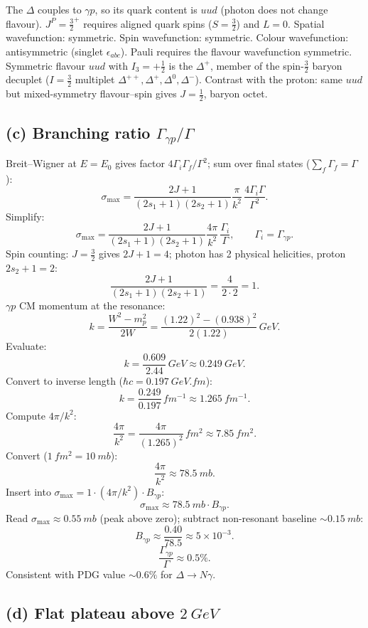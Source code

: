 \documentclass[11pt]{article}
\begin{document}
The $\Delta$ couples to $\gamma p$, so its quark content is $uud$ (photon does not change flavour). $J^{P}=\tfrac32^{+}$ requires aligned quark spins ($S=\tfrac32$) and $L=0$. Spatial wavefunction: symmetric. Spin wavefunction: symmetric. Colour wavefunction: antisymmetric (singlet $\epsilon_{abc}$). Pauli requires the flavour wavefunction symmetric. Symmetric flavour $uud$ with $I_3=+\tfrac12$ is the $\Delta^{+}$, member of the spin-$\tfrac32$ baryon decuplet ($I=\tfrac32$ multiplet $\Delta^{++},\Delta^{+},\Delta^{0},\Delta^{-}$). Contrast with the proton: same $uud$ but mixed-symmetry flavour--spin gives $J=\tfrac12$, baryon octet.

\subsection*{(c) Branching ratio $\Gamma_{\gamma p}/\Gamma$}

Breit--Wigner at $E=E_0$ gives factor $4\Gamma_i\Gamma_f/\Gamma^{2}$; sum over final states ($\sum_f\Gamma_f=\Gamma$):
\[
\sigma_{\max}=\frac{2J+1}{(2s_1+1)(2s_2+1)}\frac{\pi}{k^{2}}\,\frac{4\Gamma_i\Gamma}{\Gamma^{2}}.
\]
Simplify:
\[
\sigma_{\max}=\frac{2J+1}{(2s_1+1)(2s_2+1)}\frac{4\pi}{k^{2}}\,\frac{\Gamma_i}{\Gamma},\qquad \Gamma_i=\Gamma_{\gamma p}.
\]
Spin counting: $J=\tfrac32$ gives $2J+1=4$; photon has 2 physical helicities, proton $2s_2+1=2$:
\[
\frac{2J+1}{(2s_1+1)(2s_2+1)}=\frac{4}{2\cdot 2}=1.
\]
$\gamma p$ CM momentum at the resonance:
\[
k=\frac{W^{2}-m_p^{2}}{2W}=\frac{(1.22)^{2}-(0.938)^{2}}{2(1.22)}\,\si{GeV}.
\]
Evaluate:
\[
k=\frac{0.609}{2.44}\,\si{GeV}\approx \SI{0.249}{GeV}.
\]
Convert to inverse length ($\hbar c=\SI{0.197}{GeV.fm}$):
\[
k=\frac{0.249}{0.197}\,\si{fm^{-1}}\approx \SI{1.265}{fm^{-1}}.
\]
Compute $4\pi/k^{2}$:
\[
\frac{4\pi}{k^{2}}=\frac{4\pi}{(1.265)^{2}}\,\si{fm^{2}}\approx \SI{7.85}{fm^{2}}.
\]
Convert ($\SI{1}{fm^{2}}=\SI{10}{mb}$):
\[
\frac{4\pi}{k^{2}}\approx \SI{78.5}{mb}.
\]
Insert into $\sigma_{\max}=1\cdot(4\pi/k^{2})\cdot B_{\gamma p}$:
\[
\sigma_{\max}\approx \SI{78.5}{mb}\cdot B_{\gamma p}.
\]
Read $\sigma_{\max}\approx \SI{0.55}{mb}$ (peak above zero); subtract non-resonant baseline $\sim\SI{0.15}{mb}$:
\[
B_{\gamma p}\approx \frac{0.40}{78.5}\approx 5\times 10^{-3}.
\]
\begin{equation}
\boxed{\;\frac{\Gamma_{\gamma p}}{\Gamma}\approx 0.5\%.\;}
\label{eq:Bgammap}
\end{equation}
Consistent with PDG value $\sim 0.6\%$ for $\Delta\to N\gamma$.

\subsection*{(d) Flat plateau above $\SI{2}{GeV}$}
\end{document}
